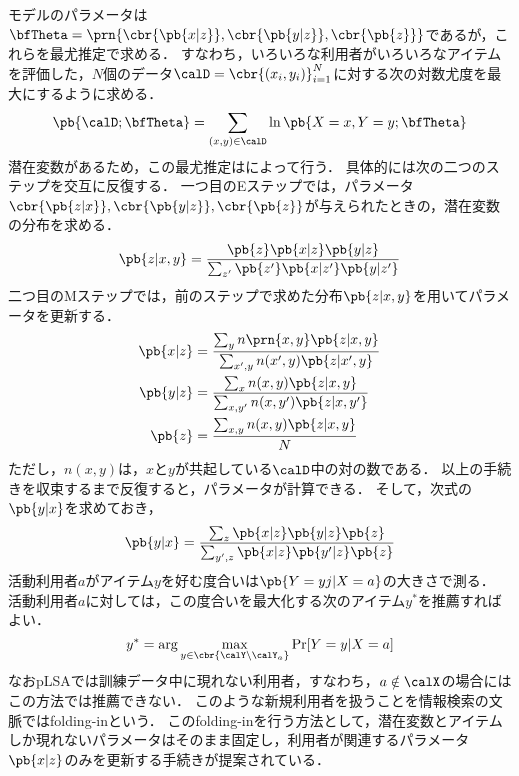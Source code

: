 モデルのパラメータは$\bfTheta = \prn{\cbr{\pb{x|z}}, \cbr{\pb{y|z}},\cbr{\pb{z}}}$であるが，これらを最尤推定で求める．
すなわち，いろいろな利用者がいろいろなアイテムを評価した，$N$個のデータ$\calD=\cbr{(x_i,y_i)}_{i=1}^N$に対する次の対数尤度を最大にするように求める．
\[
\pb{\calD; \bfTheta} = \sum_{(x,y)\in \calD} \ln\pb{X=x, Y=y; \bfTheta}
\]
潜在変数があるため，この最尤推定は\cite{jrss:77:01,jpublist:077x}によって行う．
具体的には次の二つのステップを交互に反復する．
一つ目のEステップでは，パラメータ$\cbr{\pb{z|x}},\cbr{\pb{y|z}},\cbr{\pb{z}}$が与えられたときの，潜在変数
の分布を求める．
\begin{equation}
\pb{z|x,y}=\frac{\pb{z}\pb{x|z}\pb{y|z}}{\sum_{z'}\pb{z'}\pb{x|z'}\pb{y|z'}}
\label{eq:estep}
\end{equation}
二つ目のMステップでは，前のステップで求めた分布$\pb{z|x,y}$を用いてパラメータを更新する．
\begin{align}
\pb{x|z} & = \frac{\sum_y n\prn{x,y} \pb{z|x,y}}{\sum_{x',y}n(x',y)\pb{z|x',y}}\label{eq:mstepx}\\
\pb{y|z} & = \frac{\sum_x n(x,y) \pb{z|x,y}}{\sum_{x,y'} n(x,y') \pb{z|x,y'}}\label{eq:mstepy}\\
\pb{z} &=\frac{\sum_{x,y}n(x,y)\pb{z|x,y}}{N}\label{eq:mstepz}
\end{align}
ただし，$n(x,y)$は，$x$と$y$が共起している$\calD$中の対の数である．
以上の手続きを収束するまで反復すると，パラメータが計算できる．
そして，次式の$\pb{y|x}$を求めておき，
\begin{equation}
\pb{y|x} = \frac{\sum_z\pb{x|z} \pb{y|z} \pb{z}}{\sum_{y',z}\pb{x|z} \pb{y'|z} \pb{z}}
\end{equation}
活動利用者$a$がアイテム$y$を好む度合いは$\pb{Y=yj|X=a}$の大きさで測る．
活動利用者$a$に対しては，この度合いを最大化する次のアイテム$y^\ast$を推薦すればよい．
\begin{equation}
y^\ast=\arg\max_{y\in\cbr{\calY\backslash\calY_{a}}}\Pr[Y=y|X=a]
\end{equation}
なおpLSAでは訓練データ中に現れない利用者，すなわち，$a\notin\calX$の場合にはこの方法では推薦できない．
このような新規利用者を扱うことを情報検索の文脈ではfolding-inという．
このfolding-inを行う方法として，潜在変数とアイテムしか現れないパラメータはそのまま固定し，利用者が関連するパラメータ$\pb{x|z}$のみを更新する手続きが提案されている\cite{misc:089}．

